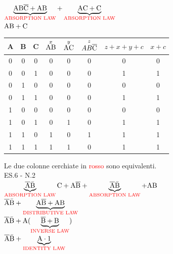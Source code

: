 \centering
 $\underbrace{\text{A}\text{B}\overline{\text{C}} + \text{A}\text{B}} _{\textrm{\color{red} ABSORPTION LAW}} + \underbrace{\text{A}\text{C} + \text{C}} _{\textrm{\color{red} ABSORPTION LAW}}  $\\
	 $\text{A}\text{B} + \text{C} $ \\
\flushleft

\begin{tabular}{|c|c|c|c||c||c|c|c|}
	\hline
	A & B & C & $\overset{x}{\text{A}\text{B}}$ & $\overset{y}{\text{A}\text{C}}$ & $\overset{z}{AB\overline{\text{C}}}$ & $ z + x + y + c $ & $x + c$\\
	\hline
	0 & 0 & 0 & 0 & 0 & 0 & 0 & 0\\
	\hline
	0 & 0 & 1 & 0 & 0 & 0 & 1 & 1\\
	\hline
	0 & 1 & 0 & 0 & 0 & 0 & 0 & 0\\
	\hline
	0 & 1 & 1 & 0 & 0 & 0 & 1 & 1\\
	\hline
	1 & 0 & 0 & 0 & 0 & 0 & 0 & 0\\
	\hline
	1 & 0 & 1 & 0 & 1 & 0 & 1 & 1\\
	\hline
	1 & 1 & 0 & 1 & 0 & 1 & 1 & 1\\
	\hline
	1 & 1 & 1 & 1 & 1 & 0 & 1 & 1\\
	\hline
\end{tabular}


\textsf{{\small Le due colonne cerchiate in \textcolor{red}{rosso} sono equivalenti.}} \\

\textrm{\color{red} ES.6 - N.2} \\

\centering
$ \underbrace{\overline{\text{A}}\bar{\text{B}}} _{\textrm{\color{red} ABSORPTION LAW}} \text{C} + \text{A}\overline{\text{B}} + \underbrace{\overline{\text{A}}\bar{\text{B}}} _{\textrm{\color{red} ABSORPTION LAW}} + \text{A}\text{B} $ \\

$ \overline{\text{A}}\bar{\text{B}} + \underbrace{\text{A}\overline{\text{B}} + \text{A}\text{B}} _{\textrm{\color{red} DISTRIBUTIVE LAW}} $ \\

$ \overline{\text{A}}\bar{\text{B}} + \text{A}(\underbrace{\overline{\text{B}} + \text{B}} _{\textrm{\color{red} INVERSE LAW}}) $ \\

$ \overline{\text{A}}\bar{\text{B}} + \underbrace{\text{A} \cdot 1} _{\textrm{\color{red} IDENTITY LAW}} $ \\

